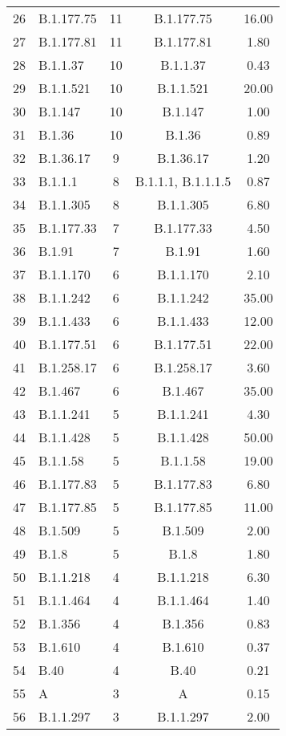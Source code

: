\begin{longtable}{lp{4cm}ccc}
  26 & B.1.177.75 &  11 & B.1.177.75 & 16.00 \\ 
  27 & B.1.177.81 &  11 & B.1.177.81 & 1.80 \\ 
  28 & B.1.1.37 &  10 & B.1.1.37 & 0.43 \\ 
  29 & B.1.1.521 &  10 & B.1.1.521 & 20.00 \\ 
  30 & B.1.147 &  10 & B.1.147 & 1.00 \\ 
  31 & B.1.36 &  10 & B.1.36 & 0.89 \\ 
  32 & B.1.36.17 &   9 & B.1.36.17 & 1.20 \\ 
  33 & B.1.1.1 &   8 & B.1.1.1, B.1.1.1.5 & 0.87 \\ 
  34 & B.1.1.305 &   8 & B.1.1.305 & 6.80 \\ 
  35 & B.1.177.33 &   7 & B.1.177.33 & 4.50 \\ 
  36 & B.1.91 &   7 & B.1.91 & 1.60 \\ 
  37 & B.1.1.170 &   6 & B.1.1.170 & 2.10 \\ 
  38 & B.1.1.242 &   6 & B.1.1.242 & 35.00 \\ 
  39 & B.1.1.433 &   6 & B.1.1.433 & 12.00 \\ 
  40 & B.1.177.51 &   6 & B.1.177.51 & 22.00 \\ 
  41 & B.1.258.17 &   6 & B.1.258.17 & 3.60 \\ 
  42 & B.1.467 &   6 & B.1.467 & 35.00 \\ 
  43 & B.1.1.241 &   5 & B.1.1.241 & 4.30 \\ 
  44 & B.1.1.428 &   5 & B.1.1.428 & 50.00 \\ 
  45 & B.1.1.58 &   5 & B.1.1.58 & 19.00 \\ 
  46 & B.1.177.83 &   5 & B.1.177.83 & 6.80 \\ 
  47 & B.1.177.85 &   5 & B.1.177.85 & 11.00 \\ 
  48 & B.1.509 &   5 & B.1.509 & 2.00 \\ 
  49 & B.1.8 &   5 & B.1.8 & 1.80 \\ 
  50 & B.1.1.218 &   4 & B.1.1.218 & 6.30 \\ 
  51 & B.1.1.464 &   4 & B.1.1.464 & 1.40 \\ 
  52 & B.1.356 &   4 & B.1.356 & 0.83 \\ 
  53 & B.1.610 &   4 & B.1.610 & 0.37 \\ 
  54 & B.40 &   4 & B.40 & 0.21 \\ 
  55 & A &   3 & A & 0.15 \\ 
  56 & B.1.1.297 &   3 & B.1.1.297 & 2.00 \\ 

\end{longtable}
